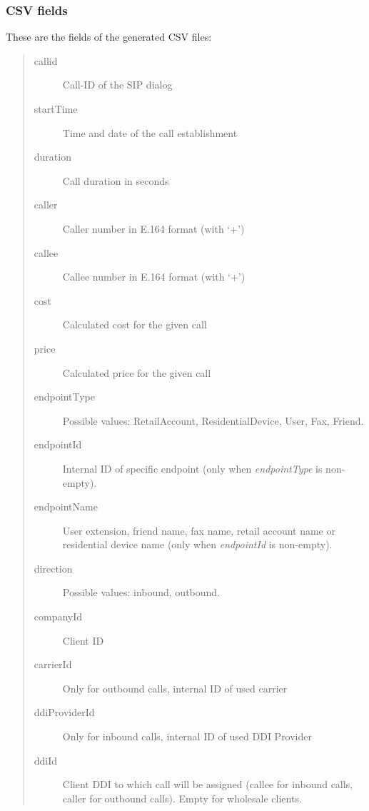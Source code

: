 \documentclass[letterpaper,10pt,spanish]{sphinxmanual}
\begin{document}
\subsubsection{CSV fields}
\label{administration_portal/brand/calls/call_csv_schedulers:csv-fields}
These are the fields of the generated CSV files:
\begin{quote}
\begin{description}
\item[{callid}] \leavevmode
Call-ID of the SIP dialog

\item[{startTime}] \leavevmode
Time and date of the call establishment

\item[{duration}] \leavevmode
Call duration in seconds

\item[{caller}] \leavevmode
Caller number in E.164 format (with `+')

\item[{callee}] \leavevmode
Callee number in E.164 format (with `+')

\item[{cost}] \leavevmode
Calculated cost for the given call

\item[{price}] \leavevmode
Calculated price for the given call

\item[{endpointType}] \leavevmode
Possible values: RetailAccount, ResidentialDevice, User, Fax, Friend.

\item[{endpointId}] \leavevmode
Internal ID of specific endpoint (only when \emph{endpointType} is non-empty).

\item[{endpointName}] \leavevmode
User extension, friend name, fax name, retail account name or residential device name (only when \emph{endpointId} is non-empty).

\item[{direction}] \leavevmode
Possible values: inbound, outbound.

\item[{companyId}] \leavevmode
Client ID

\item[{carrierId}] \leavevmode
Only for outbound calls, internal ID of used carrier

\item[{ddiProviderId}] \leavevmode
Only for inbound calls, internal ID of used DDI Provider

\item[{ddiId}] \leavevmode
Client DDI to which call will be assigned (callee for inbound calls, caller for outbound calls). Empty for
wholesale clients.

\end{description}
\end{quote}
\end{document}
